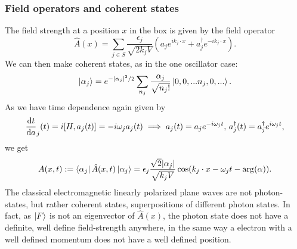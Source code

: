 \subsubsection*{Field operators and coherent states}
The field strength at a position $x$ in the box is given by the field operator
\begin{equation}
    \hat A(x) = \sum_{j \in S} \frac{\epsilon_j}{\sqrt {2k_jV}} \left(a_j e^{ik_j\cdot x} + a^\dagger_je^{-ik_j\cdot x}\right).
\end{equation}
We can then make coherent states, as in the one oscillator case:
\begin{equation*}
    \ket{\alpha_j} = e^{-|\alpha_j|^2/2}\sum_{n_j} \frac{\alpha_j}{\sqrt{n_j !}} \ket{0, 0, ... n_j, 0, ...}.
\end{equation*}
As we have time dependence again given by
\begin{equation*}
    \odv{t} a_j(t) = i[H, a_j(t)] = -i\omega_j a_j(t) \implies a_j(t) = a_je^{-i\omega_j t}, \, a_j^\dagger(t) = a_j^\dagger e^{i\omega_j t},
\end{equation*}
we get
\begin{equation*}
    A(x, t) := \bra{\alpha_j} \hat A(x, t) \ket{\alpha_j} = \epsilon_j \frac{\sqrt 2 |\alpha_j|}{\sqrt{k_j V}} \cos(k_j\cdot x - \omega_j t - \arg(\alpha)).
\end{equation*}
The classical electromagnetic linearly polarized plane waves are not photon-states, but rather coherent states, superpositions of different photon states. In fact, as $\ket{F}$ is not an eigenvector of $\hat A(x)$, the photon state does not have a definite, well define field-strength anywhere, in the same way a electron with a well defined momentum does not have a well defined position.

